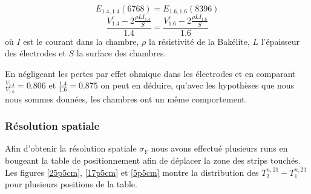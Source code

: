 \begin{equation}
E_{\num{1.4},\num{1.4}}\left( 6768 \right)=E_{\num{1.6},\num{1.6}}\left( 8396 \right)
\end{equation} 
\begin{equation}
\frac{V^c_{1.4}-2\frac{\rho L I_{1.4}}{S} }{1.4}=\frac{V^c_{1.6}-2\frac{\rho L I_{1.6}}{S} }{1.6}
\end{equation} 
où $I$ est le courant dans la chambre, $\rho$ la résistivité de la Bakélite, $L$ l'épaisseur des électrodes et $S$ la surface des chambres.

En négligeant les pertes par effet ohmique dans les électrodes et en comparant $\frac{V_{1.4}}{V_{1.6}}=\num{0.806}$ et $\frac{1.4}{1.6}=\num{0.875}$ on peut en déduire, qu'avec les hypothèses que nous nous sommes données, les chambres ont un même comportement.

\subsubsection{Résolution spatiale}

Afin d'obtenir la résolution spatiale $\sigma_{Y}$ nous avons effectué plusieurs runs en bougeant la table de positionnement afin de déplacer la zone des strips touchés. Les figures \ref{25p5cm}, \ref{17p5cm} et \ref{5p5cm} montre la distribution des $T^{n,21}_2-T^{n,21}_1$ pour plusieurs positions de la table. 

